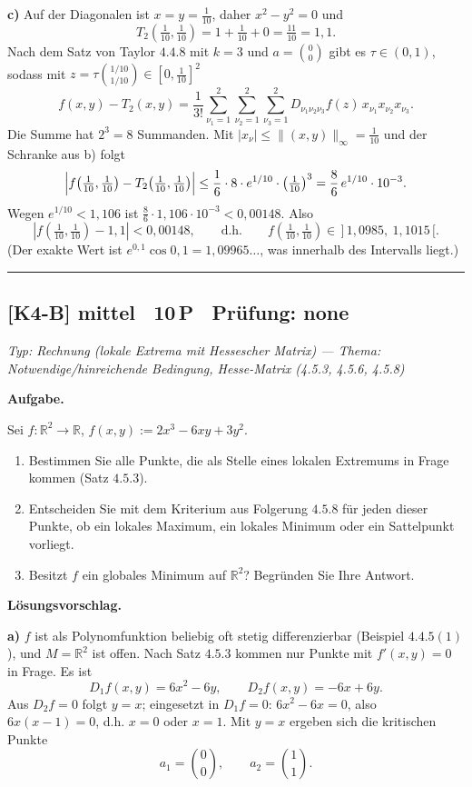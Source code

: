 \documentclass[a4paper,11pt]{article}
\begin{document}
\textbf{c)} Auf der Diagonalen ist $x=y=\tfrac1{10}$, daher $x^2-y^2=0$ und
\[ T_2\!\left(\tfrac1{10},\tfrac1{10}\right)=1+\tfrac1{10}+0=\tfrac{11}{10}=1{,}1. \]
Nach dem Satz von Taylor $4.4.8$ mit $k=3$ und $a=\binom00$ gibt es $\tau\in(0,1)$, sodass mit $z=\tau\binom{1/10}{1/10}\in[0,\tfrac1{10}]^2$
\[ f(x,y)-T_2(x,y)=\frac{1}{3!}\sum_{\nu_1=1}^{2}\sum_{\nu_2=1}^{2}\sum_{\nu_3=1}^{2} D_{\nu_1\nu_2\nu_3}f(z)\,x_{\nu_1}x_{\nu_2}x_{\nu_3}. \]
Die Summe hat $2^3=8$ Summanden. Mit $|x_{\nu}|\le\|(x,y)\|_\infty=\tfrac1{10}$ und der Schranke aus b) folgt
\[ \Bigl|f\!\left(\tfrac1{10},\tfrac1{10}\right)-T_2\!\left(\tfrac1{10},\tfrac1{10}\right)\Bigr| \le \frac{1}{6}\cdot 8\cdot e^{1/10}\cdot\left(\tfrac{1}{10}\right)^3 = \frac{8}{6}\,e^{1/10}\cdot 10^{-3}. \]
Wegen $e^{1/10}<1{,}106$ ist $\tfrac{8}{6}\cdot 1{,}106\cdot 10^{-3}<0{,}00148$. Also
\[ |f(\tfrac1{10},\tfrac1{10})-1{,}1|<0{,}00148,\qquad\text{d.h.}\qquad f\!\left(\tfrac1{10},\tfrac1{10}\right)\in\,]\,1{,}0985,\ 1{,}1015\,[. \]
(Der exakte Wert ist $e^{0{,}1}\cos 0{,}1=1{,}09965\ldots$, was innerhalb des Intervalls liegt.)\par\bigskip\hrule\bigskip
\subsection*{[K4-B] \normalfont mittel \textbullet\ 10\,P \textbullet\ Pr\"ufung: none}
\textit{Typ: Rechnung (lokale Extrema mit Hessescher Matrix)  ---  Thema: Notwendige/hinreichende Bedingung, Hesse-Matrix (4.5.3, 4.5.6, 4.5.8)}\par\smallskip
\textbf{Aufgabe.}\par
Sei $f:\mathbb{R}^2\to\mathbb{R}$, $f(x,y):=2x^3-6xy+3y^2$.
\begin{enumerate}[label=\alph*)]
  \item Bestimmen Sie alle Punkte, die als Stelle eines lokalen Extremums in Frage kommen (Satz $4.5.3$).
  \item Entscheiden Sie mit dem Kriterium aus Folgerung $4.5.8$ für jeden dieser Punkte, ob ein lokales Maximum, ein lokales Minimum oder ein Sattelpunkt vorliegt.
  \item Besitzt $f$ ein globales Minimum auf $\mathbb{R}^2$? Begründen Sie Ihre Antwort.
\end{enumerate}\par\smallskip
\textbf{L\"osungsvorschlag.}\par
\textbf{a)} $f$ ist als Polynomfunktion beliebig oft stetig differenzierbar (Beispiel $4.4.5(1)$), und $M=\mathbb{R}^2$ ist offen. Nach Satz $4.5.3$ kommen nur Punkte mit $f'(x,y)=0$ in Frage. Es ist
\[ D_1f(x,y)=6x^2-6y,\qquad D_2f(x,y)=-6x+6y. \]
Aus $D_2f=0$ folgt $y=x$; eingesetzt in $D_1f=0$: $6x^2-6x=0$, also $6x(x-1)=0$, d.h. $x=0$ oder $x=1$. Mit $y=x$ ergeben sich die kritischen Punkte
\[ a_1=\binom{0}{0},\qquad a_2=\binom{1}{1}. \]
\end{document}
